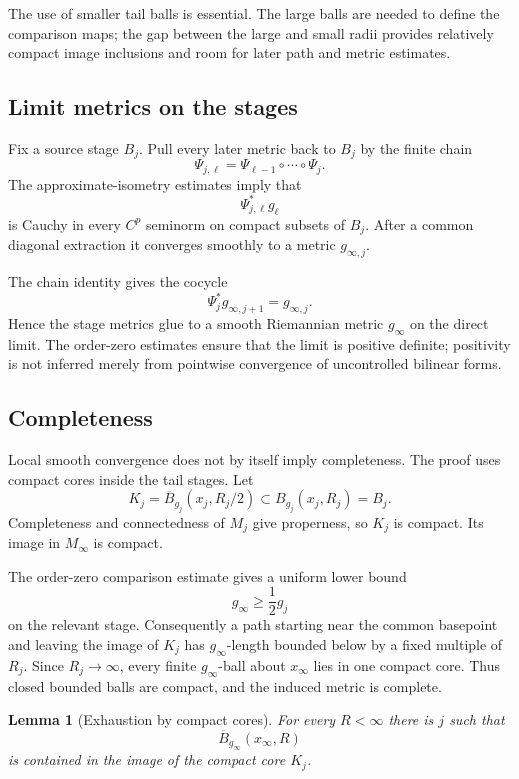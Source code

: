 \documentclass[11pt]{article}
\theoremstyle{plain}
\newtheorem{lemma}[theorem]{Lemma}
\theoremstyle{definition}
\theoremstyle{remark}
\begin{document}
The use of smaller tail balls is essential.  The large balls are needed to
define the comparison maps; the gap between the large and small radii
provides relatively compact image inclusions and room for later path and
metric estimates.

\subsection{Limit metrics on the stages}

Fix a source stage \(B_j\).  Pull every later metric back to \(B_j\) by the
finite chain
\[
  \Psi_{j,\ell}
  =
  \Psi_{\ell-1}\circ\cdots\circ\Psi_j.
\]
The approximate-isometry estimates imply that
\[
  \Psi_{j,\ell}^*g_\ell
\]
is Cauchy in every \(C^p\) seminorm on compact subsets of \(B_j\).  After a
common diagonal extraction it converges smoothly to a metric
\(g_{\infty,j}\).

The chain identity gives the cocycle
\[
  \Psi_j^*g_{\infty,j+1}=g_{\infty,j}.
\]
Hence the stage metrics glue to a smooth Riemannian metric \(g_\infty\) on
the direct limit.  The order-zero estimates ensure that the limit is positive
definite; positivity is not inferred merely from pointwise convergence of
uncontrolled bilinear forms.

\subsection{Completeness}

Local smooth convergence does not by itself imply completeness.  The proof
uses compact cores inside the tail stages.  Let
\[
  K_j
  =
  \overline{B}_{g_j}(x_j,R_j/2)
  \subset B_{g_j}(x_j,R_j)=B_j.
\]
Completeness and connectedness of \(M_j\) give properness, so \(K_j\) is
compact.  Its image in \(M_\infty\) is compact.

The order-zero comparison estimate gives a uniform lower bound
\[
  g_\infty\geq \frac12 g_j
\]
on the relevant stage.  Consequently a path starting near the common
basepoint and leaving the image of \(K_j\) has \(g_\infty\)-length bounded
below by a fixed multiple of \(R_j\).  Since \(R_j\to\infty\), every finite
\(g_\infty\)-ball about \(x_\infty\) lies in one compact core.  Thus closed
bounded balls are compact, and the induced metric is complete.

\begin{lemma}[Exhaustion by compact cores]\label{lem:core}
For every \(R<\infty\) there is \(j\) such that
\[
  \overline{B}_{g_\infty}(x_\infty,R)
\]
is contained in the image of the compact core \(K_j\).
\end{lemma}
\end{document}
